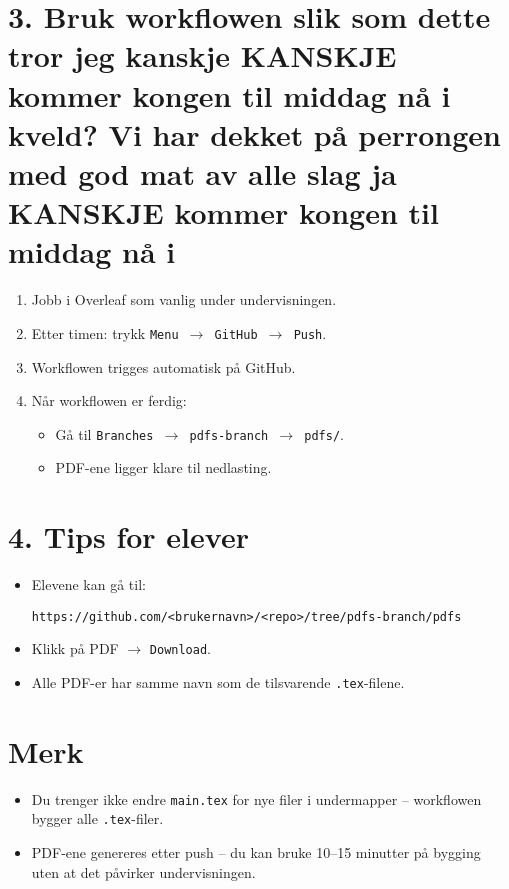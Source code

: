 \documentclass[a4paper,12pt]{article}
\begin{document}
\section*{3. Bruk workflowen slik som dette tror jeg kanskje KANSKJE kommer kongen til middag nå i kveld? Vi har dekket på perrongen med god mat av alle slag ja KANSKJE kommer kongen til middag nå i}
\begin{enumerate}[label=\arabic*.]
    \item Jobb i Overleaf som vanlig under undervisningen.
    \item Etter timen: trykk \texttt{Menu $\to$ GitHub $\to$ Push}.
    \item Workflowen trigges automatisk på GitHub.
    \item Når workflowen er ferdig:
    \begin{itemize}
        \item Gå til \texttt{Branches $\to$ pdfs-branch $\to$ pdfs/}.
        \item PDF-ene ligger klare til nedlasting.
    \end{itemize}
\end{enumerate}

\section*{4. Tips for elever}
\begin{itemize}
    \item Elevene kan gå til:
    \begin{verbatim}
https://github.com/<brukernavn>/<repo>/tree/pdfs-branch/pdfs
    \end{verbatim}
    \item Klikk på PDF $\to$ \texttt{Download}.
    \item Alle PDF-er har samme navn som de tilsvarende \texttt{.tex}-filene.
\end{itemize}

\section*{Merk}
\begin{itemize}
    \item Du trenger ikke endre \texttt{main.tex} for nye filer i undermapper – workflowen bygger alle \texttt{.tex}-filer.
    \item PDF-ene genereres etter push – du kan bruke 10--15 minutter på bygging uten at det påvirker undervisningen.
\end{itemize}
\end{document}
